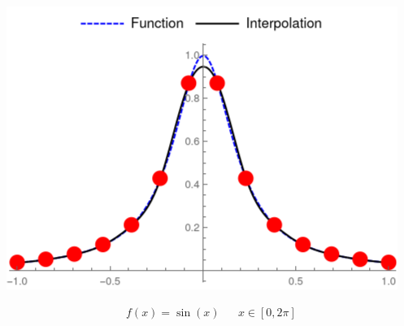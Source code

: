 \documentclass{article}
\begin{document}
{\begin{minipage}{0.3\textwidth}
        \captionsetup{justification=centering}
    \end{minipage}
    \begin{minipage}{0.3\textwidth}
        \includegraphics[width=\linewidth]{Images/RungeInterpolation_Cubic/runge_interpolation_14.png}
        \captionsetup{justification=centering}
    \end{minipage}
}
\medbreak
\begin{align*}
    f(x) = \sin(x) &  & x\in[0, 2\pi]
\end{align*}
\end{document}
